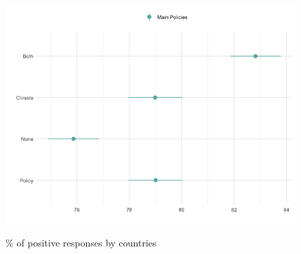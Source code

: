 \begin{frame}{}%
\begin{figure}[h!]
\caption{\% of positive responses by countries} %
\includegraphics[width=.7\paperwidth]{../figures/country_comparison/main_support_var_by_treatment.png} \\
\end{figure}
\end{frame}


